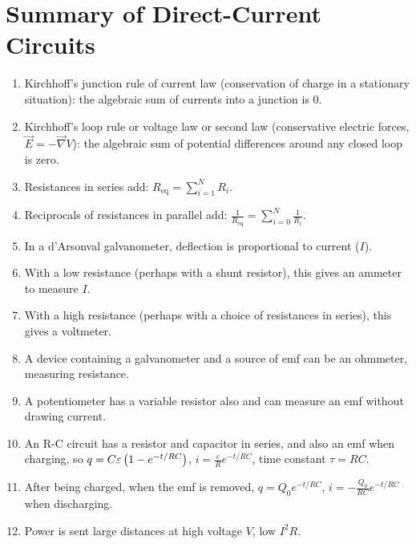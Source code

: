 \section{Summary of Direct-Current Circuits}
\begin{enumerate}
\item Kirchhoff's junction rule of current law (conservation of charge in a stationary situation): the algebraic sum of currents into a junction is 0.
\item Kirchhoff's loop rule or voltage law or second law (conservative electric forces, $\vec{E} = -\vec{\nabla}V$): the algebraic sum of potential differences around any closed loop is zero.
\item Resistances in series add: $R_\text{eq} = \sum_{i=1}^{N} R_i$.
\item Reciprocals of resistances in parallel add: $\frac{1}{R_\text{eq}} = \sum_{i=0}^{N} \frac{1}{R_i}$. 
\item In a d'Arsonval galvanometer, deflection is proportional to current ($I$).
\item With a low resistance (perhaps with a shunt resistor), this gives an ammeter to measure $I$.
\item With a high resistance (perhaps with a choice of resistances in series), this gives a voltmeter.
\item A device containing a galvanometer and a source of emf can be an ohmmeter, measuring resistance.
\item A potentiometer has a variable resistor also and can measure an emf without drawing current.
\item An R-C circuit has a resistor and capacitor in series, and also an emf when charging, so $q = C\varepsilon\left(  1-e^{-t/RC}  \right)$, $i = \frac{\varepsilon}{R}e^{-t/RC}$, time constant $\tau = RC$.
\item After being charged, when the emf is removed, $q = Q_0 e^{-t/RC}$, $i = -\frac{Q_0}{RC}e^{-t/RC}$ when discharging.
\item Power is sent large distances at high voltage $V$, low $I^2R$.
\end{enumerate}